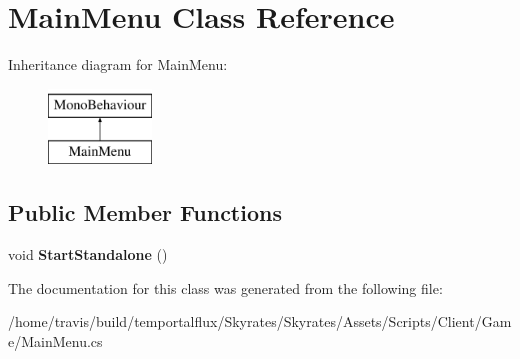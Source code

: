 \hypertarget{class_main_menu}{\section{Main\-Menu Class Reference}
\label{class_main_menu}
}
Inheritance diagram for Main\-Menu\-:\begin{figure}[H]
\begin{center}
\leavevmode
\includegraphics[height=2.000000cm]{class_main_menu}
\end{center}
\end{figure}
\subsection*{Public Member Functions}
\begin{DoxyCompactItemize}
\item 
\hypertarget{class_main_menu_a3d5d666c1fb30c7340243c3af43bd9f1}{void {\bfseries Start\-Standalone} ()}\label{class_main_menu_a3d5d666c1fb30c7340243c3af43bd9f1}

\end{DoxyCompactItemize}


The documentation for this class was generated from the following file\-:\begin{DoxyCompactItemize}
\item 
/home/travis/build/temportalflux/\-Skyrates/\-Skyrates/\-Assets/\-Scripts/\-Client/\-Game/Main\-Menu.\-cs\end{DoxyCompactItemize}
